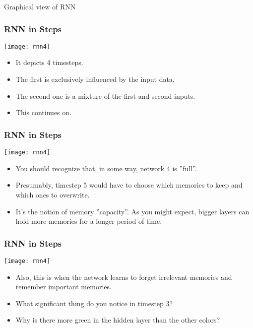 \begin{frame}
  \begin{center}
    {\Large Graphical view of RNN}
  \end{center}
\end{frame}


\begin{frame}[fragile] \frametitle{RNN in Steps}
\begin{center}
\texttt{[image: rnn4]}
\end{center}
\begin{itemize}
\item It depicts 4 timesteps. 
\item The first is exclusively influenced by the input data. 
\item The second one is a mixture of the first and second inputs. 
\item This continues on. 
\end{itemize}
\end{frame}

\begin{frame}[fragile] \frametitle{RNN in Steps}
\begin{center}
\texttt{[image: rnn4]}
\end{center}
\begin{itemize}
\item You should recognize that, in some way, network 4 is ''full''. 
\item Presumably, timestep 5 would have to choose which memories to keep and which ones to overwrite. 
\item It's the notion of memory ''capacity''. As you might expect, bigger layers can hold more memories for a longer period of time.
\end{itemize}
\end{frame}

\begin{frame}[fragile] \frametitle{RNN in Steps}
\begin{center}
\texttt{[image: rnn4]}
\end{center}
\begin{itemize}
\item Also, this is when the network learns to forget irrelevant memories and remember important memories. 
\item What significant thing do you notice in timestep 3? 
\item Why is there more green in the hidden layer than the other colors?
\end{itemize}
\end{frame}

